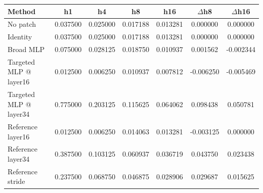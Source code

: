 \begin{tabular}{lcccccc}
\toprule
Method & h1 & h4 & h8 & h16 & $\Delta$h8 & $\Delta$h16 \\
\midrule
No patch & 0.037500 & 0.025000 & 0.017188 & 0.013281 & 0.000000 & 0.000000 \\
Identity & 0.037500 & 0.025000 & 0.017188 & 0.013281 & 0.000000 & 0.000000 \\
Broad MLP & 0.075000 & 0.028125 & 0.018750 & 0.010937 & 0.001562 & -0.002344 \\
Targeted MLP @ layer16 & 0.012500 & 0.006250 & 0.010937 & 0.007812 & -0.006250 & -0.005469 \\
Targeted MLP @ layer34 & 0.775000 & 0.203125 & 0.115625 & 0.064062 & 0.098438 & 0.050781 \\
Reference layer16 & 0.012500 & 0.006250 & 0.014063 & 0.013281 & -0.003125 & 0.000000 \\
Reference layer34 & 0.387500 & 0.103125 & 0.060937 & 0.036719 & 0.043750 & 0.023438 \\
Reference stride & 0.237500 & 0.068750 & 0.046875 & 0.028906 & 0.029687 & 0.015625 \\
\bottomrule
\end{tabular}
